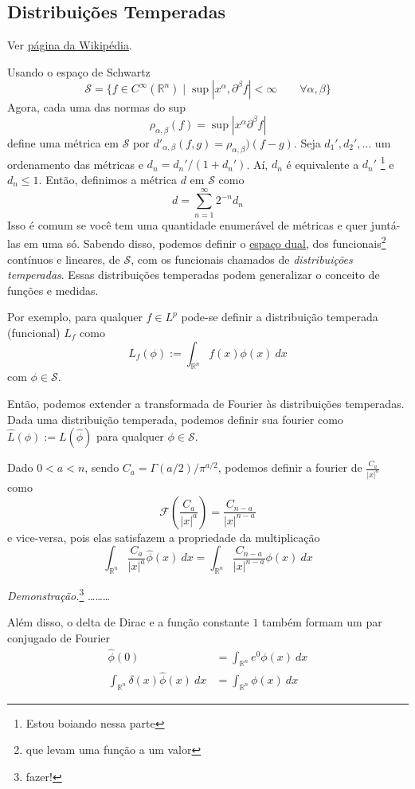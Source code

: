 \documentclass[11pt]{article}
\newcommand{\Rn}{{\mathbb{R}^n}}
\newcommand{\p}{\partial}
\begin{document}
\subsection{Distribuições Temperadas}

Ver \href{https://en.wikipedia.org/wiki/Distribution_(mathematics)}{página da Wikipédia}.

Usando o espaço de Schwartz \[\mathcal{S} = \{ f \in C^\infty(\Rn) \mid \sup|x^\alpha, \p^\beta f| < \infty \qquad \forall \alpha,\beta\}\]
Agora, cada uma das normas do sup \[\rho_{\alpha,\beta}(f) = \sup |x^\alpha\p^\beta f| \] define uma métrica em \(\mathcal{S}\) por \(d'_{\alpha,\beta}(f,g)=\rho_{\alpha,\beta})(f-g)\). Seja \(d_1', d_2', \ldots\) um ordenamento das métricas e \(d_n = d_n' / (1 + d_n')\). Aí, \(d_n\) é equivalente a \(d_n'\) \footnote{Estou boiando nessa parte} e \(d_n \leq 1\). Então, definimos a métrica \(d\) em \(\mathcal{S}\) como \[ d = \sum_{n=1}^\infty 2^{-n}d_n \]
Isso é comum se você tem uma quantidade enumerável de métricas e quer juntá-las em uma só.
Sabendo disso, podemos definir o \href{https://en.wikipedia.org/wiki/Dual_space}{espaço dual}, dos funcionais\footnote{que levam uma função a um valor} contínuos e lineares, de \(\mathcal{S}\), com os funcionais chamados de \textit{distribuições temperadas}. Essas distribuições temperadas podem generalizar o conceito de funções e medidas.

Por exemplo, para qualquer \(f \in L^p\) pode-se definir a distribuição temperada (funcional) \(L_f\) como \[L_f(\phi) := \int_\Rn f(x)\phi(x)\ dx\] com \(\phi \in \mathcal{S}\).

Então, podemos extender a transformada de Fourier às distribuições temperadas. Dada uma distribuição temperada, podemos definir sua fourier como \(\hat{L}(\phi) := L(\hat{\phi})\) para qualquer \(\phi \in \mathcal{S}\).

Dado \(0 < a < n\), sendo \(C_a = \Gamma(a/2)/\pi^{a/2}\), podemos definir a fourier de \(\frac{C_a}{|x|^{a}}\) como \[\mathcal{F}\left(\frac{C_a}{|x|^{a}}\right) = \frac{C_{n-a}}{|x|^{n-a}}\] e vice-versa, pois elas satisfazem a propriedade da multiplicação \[\int_\Rn  \frac{C_a}{|x|^{a}} \hat{\phi}(x)\ dx = \int_\Rn \frac{C_{n-a}}{|x|^{n-a}} \phi(x)\ dx\]

\textit{Demonstração.}\footnote{fazer!} \ldots \ldots \ldots

Além disso, o delta de Dirac e a função constante \(1\) também formam um par conjugado de Fourier \begin{align*}
	\hat{\phi}(0) &= \int_\Rn e^{0} \phi(x)\ dx\\
	\int_\Rn \delta(x) \hat{\phi}(x)\ dx &= \int_\Rn \phi(x)\ dx 
\end{align*}
\end{document}
